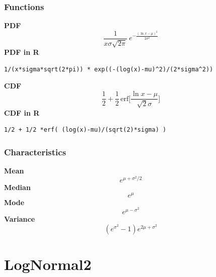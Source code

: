 \subsubsection*{Functions}

\smallskip \noindent \hspace{.2cm} \textbf{PDF} 
\begin{equation*}\frac{1}{x\sigma\sqrt{2\pi}}\ e^{-\frac{\left(\ln x-\mu\right)^2}{2\sigma^2}}\end{equation*}
\smallskip \noindent \hspace{.2cm} \textbf{PDF in R}  
\begin{verbatim}1/(x*sigma*sqrt(2*pi)) * exp((-(log(x)-mu)^2)/(2*sigma^2))\end{verbatim}
\smallskip \noindent \hspace{.2cm} \textbf{CDF} 
\begin{equation*}\frac12 + \frac12\,\text{erf}\Big[\frac{\ln x-\mu}{\sqrt{2}\sigma}\Big]\end{equation*}
\smallskip \noindent \hspace{.2cm} \textbf{CDF in R} 
\begin{verbatim}1/2 + 1/2 *erf( (log(x)-mu)/(sqrt(2)*sigma) )\end{verbatim}
\smallskip
\subsubsection*{Characteristics}
\smallskip \noindent \hspace{.2cm} \textbf{Mean} 
\begin{equation*}e^{\mu+\sigma^2/2}\end{equation*}
\smallskip \noindent \hspace{.2cm} \textbf{Median} 
\begin{equation*}e^{\mu}\end{equation*}
\smallskip \noindent \hspace{.2cm} \textbf{Mode} 
\begin{equation*}e^{\mu-\sigma^2}\end{equation*}
\smallskip \noindent \hspace{.2cm} \textbf{Variance} 
\begin{equation*}(e^{\sigma^2}\!\!-1) e^{2\mu+\sigma^2}\end{equation*}
\smallskip
\section*{LogNormal2} 

